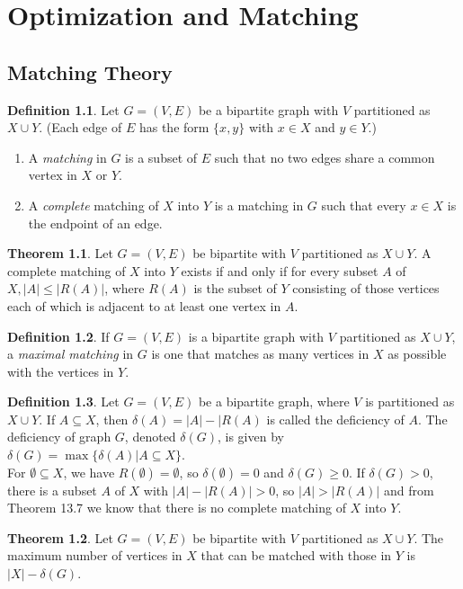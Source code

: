 \documentclass[letter]{book}
\theoremstyle{definition}
\newtheorem{theorem}{Theorem}[chapter]
\theoremstyle{definition}
\newtheorem{mydef}{Definition}[chapter]
\theoremstyle{remark}
\begin{document}
\setcounter{chapter}{12}
\chapter{Optimization and Matching}

\setcounter{section}{3}
\section{Matching Theory}
\setcounter{mydef}{8}
\begin{mydef}
    Let $G=(V,E)$ be a bipartite graph with $V$ partitioned as $X\cup Y$. (Each edge of $E$ has the form $\{x,y\}$ with $x\in X$ and $y\in Y$.)
        \begin{enumerate}
            \item A \textit{matching} in $G$ is a subset of $E$ such that no two edges share a common vertex in $X$ or $Y$.
            \item A \textit{complete} matching of $X$ into $Y$ is a matching in $G$ such that every $x\in X$ is the endpoint of an edge.
        \end{enumerate}
\end{mydef}
\setcounter{theorem}{6}
\bigskip
\begin{theorem}
    Let $G=(V,E)$ be bipartite with $V$ partitioned as $X\cup Y$. A complete matching of $X$ into $Y$ exists if and only if for every subset $A$ of $X, |A|\leq |R(A)|$, where $R(A)$ is the subset of $Y$ consisting of those vertices each of which is adjacent to at least one vertex in $A$.
\end{theorem}
\bigskip
\begin{mydef}
    If $G=(V,E)$ is a bipartite graph with $V$ partitioned as $X\cup Y$, a \textit{maximal matching} in $G$ is one that matches as many vertices in $X$ as possible with the vertices in $Y$.
\end{mydef}
\bigskip
\begin{mydef}
    Let $G=(V,E)$ be a bipartite graph, where $V$ is partitioned as $X\cup Y$. If $A\subseteq X$, then $\delta(A)=|A|-|R(A)$ is called the deficiency of $A$. The deficiency of graph $G$, denoted $\delta(G)$, is given by $\delta(G)=\max\{\delta(A)|A\subseteq X\}$.\\
    For $\emptyset\subseteq X$, we have $R(\emptyset)=\emptyset$, so $\delta(\emptyset)=0$ and $\delta(G)\geq0$. If $\delta(G)>0$, there is a subset $A$ of $X$ with $|A|-|R(A)|>0$, so $|A|>|R(A)|$ and from Theorem 13.7 we know that there is no complete matching of $X$ into $Y$.
\end{mydef}
\bigskip
\begin{theorem}
    Let $G=(V,E)$ be bipartite with $V$ partitioned as $X\cup Y$. The maximum number of vertices in $X$ that can be matched with those in $Y$ is $|X|-\delta(G)$.
\end{theorem}
\end{document}
